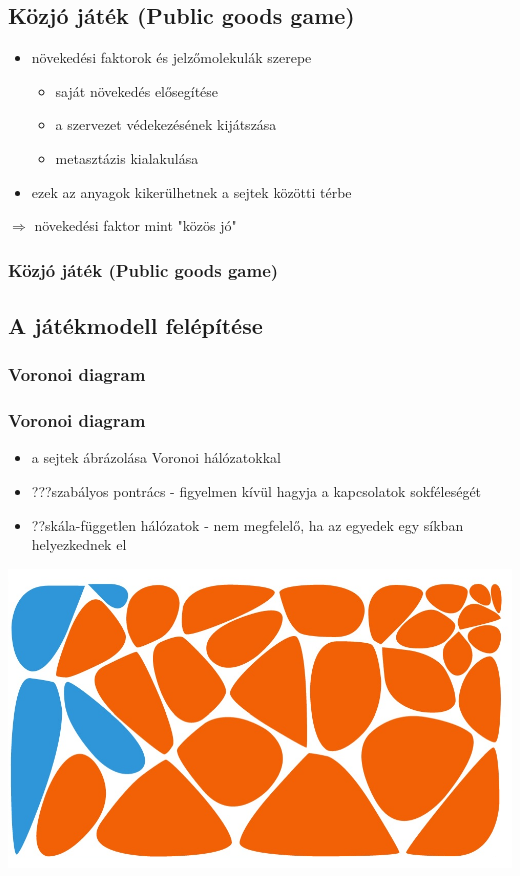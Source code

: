 \subsection{Közjó játék (Public goods game)}
\begin{frame}
\begin{itemize}
	\item növekedési faktorok és jelzőmolekulák szerepe
	\begin{itemize}
		\item saját növekedés elősegítése
		\item a szervezet védekezésének kijátszása
		\item metasztázis kialakulása
	\end{itemize}
	\item ezek az anyagok kikerülhetnek a sejtek közötti térbe
\end{itemize}
\begin{block}
	\centering
	$\Rightarrow$ növekedési faktor mint "közös jó"
\end{block}
\frametitle{Közjó játék (Public goods game)}\end{frame}

\subsection{A játékmodell felépítése}
\subsubsection{Voronoi diagram}
\begin{frame}
	\frametitle{Voronoi diagram}
	\begin{block}{}
		\begin{itemize}
			\item a sejtek ábrázolása Voronoi hálózatokkal
			\item ???szabályos pontrács - figyelmen kívül hagyja a kapcsolatok sokféleségét\cite{archetti2016cooperation}
			\item ??skála-független hálózatok - nem megfelelő, ha az egyedek egy síkban helyezkednek el\cite{archetti2016cooperation}
		\end{itemize}
	\end{block}
	
	\centering
	\includegraphics[width=0.5\linewidth]{images/Voronoi}
\end{frame}

